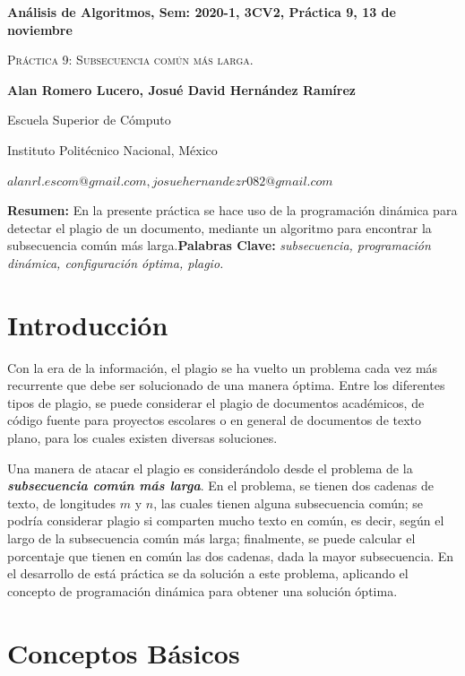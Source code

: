 \documentclass[12pt,twoside]{article}
\date{}
\begin{document}
\centerline{\bf An\'alisis de Algoritmos, Sem: 2020-1, 3CV2, Pr\'actica 9, 13 de noviembre}
\centerline{}
\centerline{}
\begin{center}
\Large{\textsc{Pr\'actica 9: Subsecuencia com\'un m\'as larga.}}
\end{center}
\centerline{\bf{Alan Romero Lucero, Josu\'e David Hern\'andez Ram\'irez}}
\centerline{}
\centerline{Escuela Superior de C\'omputo}
\centerline{Instituto Polit\'ecnico Nacional, M\'exico}
\centerline{$alanrl.escom@gmail.com, josuehernandezr082@gmail.com$}
\newtheorem{Theorem}{\quad Theorem}[section]
\newtheorem{Definition}[Theorem]{\quad Definition}
\newtheorem{Corollary}[Theorem]{\quad Corollary}
\newtheorem{Lemma}[Theorem]{\quad Lemma}
\newtheorem{Example}[Theorem]{\quad Example}
\bigskip
\textbf{Resumen:} En la presente pr\'actica se hace uso de la programaci\'on din\'amica para detectar el plagio de un documento, mediante un algoritmo para encontrar la subsecuencia com\'un m\'as larga.{\bf Palabras Clave:} {\textit{subsecuencia, programaci\'on din\'amica, configuraci\'on \'optima, plagio.}}

\section{Introducci\'on}

Con la era de la informaci\'on, el plagio se ha vuelto un problema cada vez m\'as recurrente que debe ser solucionado de una manera \'optima. Entre los diferentes tipos de plagio, se puede considerar el plagio de documentos acad\'emicos, de c\'odigo fuente para proyectos escolares o en general de documentos de texto plano, para los cuales existen diversas soluciones.

Una manera de atacar el plagio es consider\'andolo desde el problema de la \textit{\textbf{subsecuencia com\'un m\'as larga}}. En el problema, se tienen dos cadenas de texto, de longitudes $m$ y $n$, las cuales tienen alguna subsecuencia com\'un; se podr\'ia considerar plagio si comparten mucho texto en com\'un, es decir, seg\'un el largo de la subsecuencia com\'un m\'as larga; finalmente, se puede calcular el porcentaje que tienen en com\'un las dos cadenas, dada la mayor subsecuencia. En el desarrollo de est\'a pr\'actica se da soluci\'on a este problema, aplicando el concepto de programaci\'on din\'amica para obtener una soluci\'on \'optima.

\section{Conceptos B\'asicos}
\end{document}
